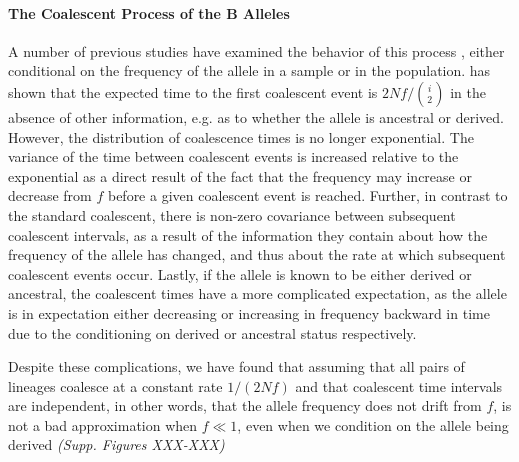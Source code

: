 \documentclass[a4paper,10pt]{article}
\newcommand{\jb}[1]{{\it\color{blue} (#1)} }
\begin{document}
\paragraph{The Coalescent Process of the B Alleles}


A number of previous studies have examined the behavior of this process \citep{Wiuf1999,Wiuf:2000js,Patterson2005}, either conditional on the frequency of the allele in a sample or in the population. \cite{Wiuf:2000js} has shown that the expected time to the first coalescent event is $2 N f/ {i \choose 2}$ in the absence of other information, e.g. as to whether the allele is ancestral or derived. However, the distribution of coalescence times is no longer exponential. The variance of the time between coalescent events is increased relative to the exponential as a direct result of the fact that the frequency may increase or decrease from $f$ before a given coalescent event is reached. Further, in contrast to the standard coalescent, there is non-zero covariance between subsequent coalescent intervals, as a result of the information they contain about how the frequency of the allele has changed, and thus about the rate at which subsequent coalescent events occur. Lastly, if the allele is known to be either derived or ancestral, the coalescent times have a more complicated expectation, as the allele is in expectation either decreasing or increasing in frequency backward in time due to the conditioning on derived or ancestral status respectively.

Despite these complications, we have found that assuming that all pairs of lineages coalesce at a constant rate $1/(2 N f)$ and that coalescent time intervals are independent, in other words, that the allele frequency does not drift from $f$, is not a bad approximation when $f \ll 1$, even when we condition on the allele being derived \jb{Supp. Figures XXX-XXX}
\end{document}
